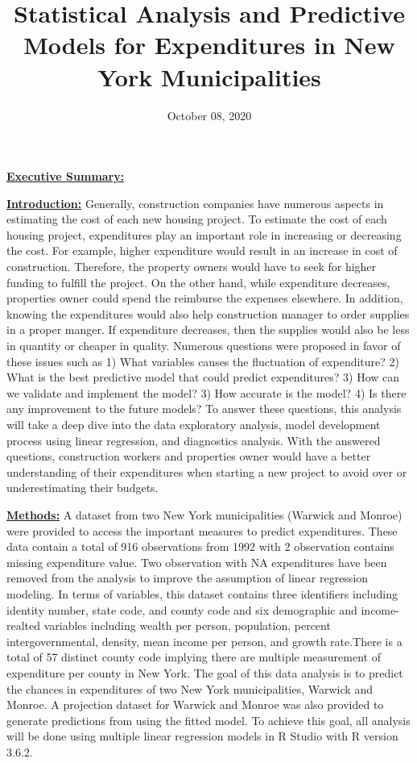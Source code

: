 \documentclass[11pt]{article}\usepackage[]{graphicx}\usepackage[]{color}
\title{Statistical Analysis and Predictive Models for Expenditures in New York Municipalities\vspace{-5ex}}
\date{October 08, 2020\vspace{-5ex}}
\begin{document}
 
\maketitle








\noindent\textbf{\underline{Executive Summary:}} 
\hfill \break

\noindent\textbf{\underline{Introduction:}} Generally, construction companies have numerous aspects in estimating the cost of each new housing project. To estimate the cost of each housing project, expenditures play an important role in increasing or decreasing the cost. For example, higher expenditure would result in an increase in cost of construction. Therefore, the property owners would have to seek for higher funding to fulfill the project. On the other hand, while expenditure decreases, properties owner could spend the reimburse the expenses elsewhere. In addition, knowing the expenditures would also help construction manager to order supplies in a proper manger. If expenditure decreases, then the supplies would also be less in quantity or cheaper in quality. Numerous questions were proposed in favor of these issues such as 1) What variables causes the fluctuation of expenditure? 2) What is the best predictive model that could predict expenditures? 3) How can we validate and implement the model? 3) How accurate is the model? 4) Is there any improvement to the future models? To answer these questions, this analysis will take a deep dive into the data exploratory analysis, model development process using linear regression, and diagnostics analysis. With the answered questions, construction workers and properties owner would have a better understanding of their expenditures when starting a new project to avoid over or underestimating their budgets.
\hfill \break

\noindent\textbf{\underline{Methods:}} A dataset from two New York municipalities (Warwick and Monroe) were provided to access the important measures to predict expenditures. These data contain a total of 916 observations from 1992 with 2 observation contains missing expenditure value. Two observation with NA expenditures have been removed from the analysis to improve the assumption of linear regression modeling. In terms of variables, this dataset contains three identifiers including identity number, state code, and county code and six demographic and income-realted variables including wealth per person, population, percent intergovernmental, density, mean income per person, and growth rate.There is a total of 57 distinct county code implying there are multiple measurement of expenditure per county in New York. The goal of this data analysis is to predict the chances in expenditures of two New York municipalities, Warwick and Monroe. A projection dataset for Warwick and Monroe was also provided to generate predictions from using the fitted model. To achieve this goal, all analysis will be done using multiple linear regression models in R Studio with R version 3.6.2.    
\hfill \break
\end{document}
